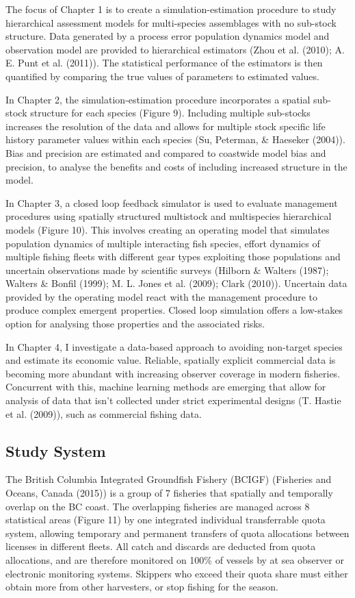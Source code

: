 \documentclass[12pt,]{scrartcl}
\begin{document}
The focus of Chapter 1 is to create a simulation-estimation procedure to
study hierarchical assessment models for multi-species assemblages with
no sub-stock structure. Data generated by a process error population
dynamics model and observation model are provided to hierarchical
estimators (Zhou et al. (2010); A. E. Punt et al. (2011)). The
statistical performance of the estimators is then quantified by
comparing the true values of parameters to estimated values.

In Chapter 2, the simulation-estimation procedure incorporates a spatial
sub-stock structure for each species (Figure 9). Including multiple
sub-stocks increases the resolution of the data and allows for multiple
stock specific life history parameter values within each species (Su,
Peterman, \& Haeseker (2004)). Bias and precision are estimated and
compared to coastwide model bias and precision, to analyse the benefits
and costs of including increased structure in the model.

In Chapter 3, a closed loop feedback simulator is used to evaluate
management procedures using spatially structured multistock and
multispecies hierarchical models (Figure 10). This involves creating an
operating model that simulates population dynamics of multiple
interacting fish species, effort dynamics of multiple fishing fleets
with different gear types exploiting those populations and uncertain
observations made by scientific surveys (Hilborn \& Walters (1987);
Walters \& Bonfil (1999); M. L. Jones et al. (2009); Clark (2010)).
Uncertain data provided by the operating model react with the management
procedure to produce complex emergent properties. Closed loop simulation
offers a low-stakes option for analysing those properties and the
associated risks.

In Chapter 4, I investigate a data-based approach to avoiding non-target
species and estimate its economic value. Reliable, spatially explicit
commercial data is becoming more abundant with increasing observer
coverage in modern fisheries. Concurrent with this, machine learning
methods are emerging that allow for analysis of data that isn't
collected under strict experimental designs (T. Hastie et al. (2009)),
such as commercial fishing data.

\subsection{Study System}\label{study-system}

The British Columbia Integrated Groundfish Fishery (BCIGF) (Fisheries
and Oceans, Canada (2015)) is a group of 7 fisheries that spatially and
temporally overlap on the BC coast. The overlapping fisheries are
managed across 8 statistical areas (Figure 11) by one integrated
individual transferrable quota system, allowing temporary and permanent
transfers of quota allocations between licenses in different fleets. All
catch and discards are deducted from quota allocations, and are
therefore monitored on 100\% of vessels by at sea observer or electronic
monitoring systems. Skippers who exceed their quota share must either
obtain more from other harvesters, or stop fishing for the season.
\end{document}
